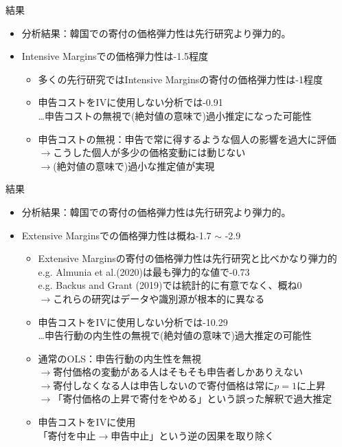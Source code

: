 \documentclass[dvipdfmx,10pt]{beamer}
\begin{document}
\begin{frame}{結果}
	\begin{itemize}
		\item 分析結果：韓国での寄付の価格弾力性は先行研究より弾力的。
		\item Intensive Marginsでの価格弾力性は-1.5程度
		\begin{itemize}
			\item 多くの先行研究ではIntensive Marginsの寄付の価格弾力性は-1程度
			\item 申告コストをIVに使用しない分析では-0.91\\
			…申告コストの無視で(絶対値の意味で)過小推定になった可能性\\
			\quad 
			\item 申告コストの無視：申告で常に得するような個人の影響を過大に評価\\
			$\to$こうした個人が多少の価格変動には動じない\\
			$\to$(絶対値の意味で)過小な推定値が実現
		\end{itemize}
	\end{itemize}
\end{frame}
\begin{frame}{結果}
		\begin{itemize}
			\item 分析結果：韓国での寄付の価格弾力性は先行研究より弾力的。
			\item Extensive Marginsでの価格弾力性は概ね-1.7 $\sim$ -2.9
			\begin{itemize}
				\item Extensive Marginsの寄付の価格弾力性は先行研究と比べかなり弾力的\\
				e.g. Almunia et al.(2020)は最も弾力的な値で-0.73\\
				e.g. Backus and Grant (2019)では統計的に有意でなく、概ね0\\
				$\to$これらの研究はデータや識別源が根本的に異なる
				\item 申告コストをIVに使用しない分析では-10.29\\
				…申告行動の内生性の無視で(絶対値の意味で)過大推定の可能性\\
				\quad 
				\item 通常のOLS：申告行動の内生性を無視\\
				$\to$寄付価格の変動がある人はそもそも申告者しかありえない\\
				$\to$寄付しなくなる人は申告しないので寄付価格は常に$p=1$に上昇\\
				$\to$「寄付価格の上昇で寄付をやめる」という誤った解釈で過大推定
				\item 申告コストをIVに使用\\
				「寄付を中止$\to$申告中止」という逆の因果を取り除く
			\end{itemize}
		\end{itemize}
\end{frame}
\end{document}
